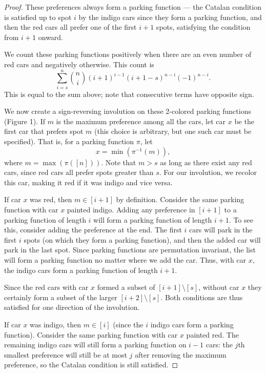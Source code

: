 \documentclass[12 pt]{amsart}
\theoremstyle{definition} %
\theoremstyle{remark} %
\begin{document}
\begin{proof}
    
    These preferences always form a parking function --- the Catalan condition is satisfied up to spot $i$ by the indigo cars since they form a parking function, and then the red cars all prefer one of the first $i + 1$ spots, satisfying the condition from $i+1$ onward.
    
    We count these parking functions positively when there are an even number of red cars and negatively otherwise. This count is
	\[
		\sum_{i = s}^{n} \binom{n}{i} (i + 1)^{i - 1} (i + 1 - s)^{n - i} (-1)^{n - i}.
	\]
	This is equal to the sum above; note that consecutive terms have opposite sign.

	We now create a sign-reversing involution on these 2-colored parking functions (Figure 1). If $m$ is the maximum preference among all the cars, let car $x$ be the first car that prefers spot $m$ (this choice is arbitrary, but one such car must be specified). That is, for a parking function $\pi$, let \[x = \min(\pi^{-1}(m)),\] where $m=\max(\pi([n]))$. Note that $m > s$ as long as there exist any red cars, since red cars all prefer spots greater than $s$. For our involution, we recolor this car, making it red if it was indigo and vice versa. 

	If car $x$ was red, then  $m\in [i + 1]$ by definition. Consider the same parking function with car $x$ painted indigo. Adding any preference in $[i + 1]$ to a parking function of length $i$ will form a parking function of length $i + 1$. To see this, consider adding the preference at the end. The first $i$ cars will park in the first $i$ spots (on which they form a parking function), and then the added car will park in the last spot. Since parking functions are permutation invariant, the list will form a parking function no matter where we add the car. Thus, with car $x$, the indigo cars form a parking function of length $i + 1$.
    
    Since the red cars with car $x$ formed a subset of $[i + 1] \setminus [s]$, without car $x$ they certainly form a subset of the larger $[i + 2] \setminus [s]$. Both conditions are thus satisfied for one direction of the involution.

	If car $x$ was indigo, then $m \in [i]$ (since the $i$ indigo cars form a parking function). Consider the same parking function with car $x$ painted red. The remaining indigo cars will still form a parking function on $i - 1$ cars: the $j$th smallest preference will still be at most $j$ after removing the maximum preference, so the Catalan condition is still satisfied.
    

\end{proof}
\end{document}
